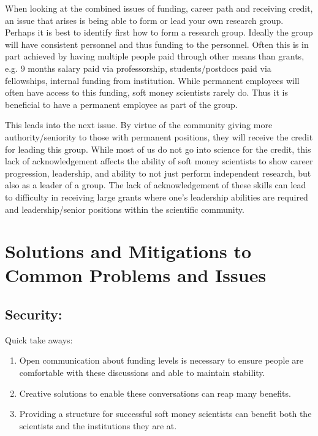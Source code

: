 \documentclass[letterpaper, 12pt]{article}
\begin{document}
When looking at the combined issues of funding, career path and receiving credit, an issue that arises is being able to form or lead your own research group. Perhaps it is best to identify first how to form a research group. Ideally the group will have consistent personnel and thus funding to the personnel. Often this is in part achieved by having multiple people paid through other means than grants, e.g. 9 months salary paid via professorship, students/postdocs paid via fellowships, internal funding from institution. While permanent employees will often have access to this funding, soft money scientists rarely do. Thus it is beneficial to have a permanent employee as part of the group. 

This leads into the next issue. By virtue of the community giving more authority/seniority to those with permanent positions, they will receive the credit for leading this group. While most of us do not go into science for the credit, this lack of acknowledgement affects the ability of soft money scientists to show career progression, leadership, and ability to not just perform independent research, but also as a leader of a group. The lack of acknowledgement of these skills can lead to difficulty in receiving large grants where one’s leadership abilities are required and leadership/senior positions within the scientific community.   

\section{Solutions and Mitigations to Common Problems and Issues}

\subsection{Security:}

\begin{tcolorbox}[enhanced,width=\textwidth,center upper,
    fontupper=\bfseries,sharp corners, colback=CASIIlightgrey, colframe=CASIIdarkgreen]
\textcolor{CASIIorange}{Quick take aways:}
\begin{enumerate}
    \item \textcolor{CASIIdarkindago}{Open communication about funding levels is necessary to ensure people are comfortable with these discussions and able to maintain stability. }
    \item \textcolor{CASIIdarkindago}{Creative solutions to enable these conversations can reap many benefits.}
    \item \textcolor{CASIIdarkindago}{Providing a structure for successful soft money scientists can benefit both the scientists and the institutions they are at.}

\end{enumerate}
\end{tcolorbox}
\end{document}
